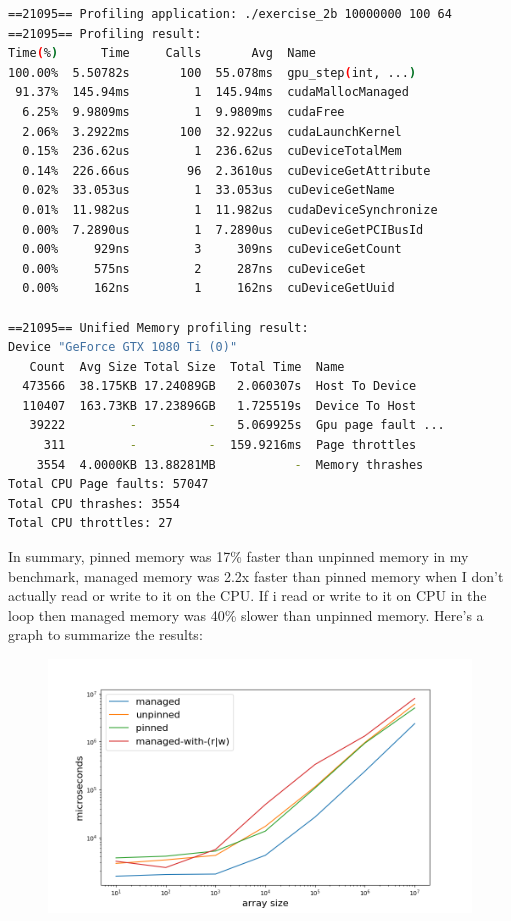 \documentclass{article}
\begin{document}
\begin{mdframed}[backgroundcolor=codeColor,leftmargin=0.0cm,hidealllines=true,%
  innerleftmargin=0.1cm,innerrightmargin=0.1cm,innertopmargin=0.5cm,innerbottommargin=0.10cm,
  roundcorner=15pt]
\begin{lstlisting}[language=bash]
==21095== Profiling application: ./exercise_2b 10000000 100 64
==21095== Profiling result:
Time(%)      Time     Calls       Avg  Name
100.00%  5.50782s       100  55.078ms  gpu_step(int, ...)
 91.37%  145.94ms         1  145.94ms  cudaMallocManaged
  6.25%  9.9809ms         1  9.9809ms  cudaFree
  2.06%  3.2922ms       100  32.922us  cudaLaunchKernel
  0.15%  236.62us         1  236.62us  cuDeviceTotalMem
  0.14%  226.66us        96  2.3610us  cuDeviceGetAttribute
  0.02%  33.053us         1  33.053us  cuDeviceGetName
  0.01%  11.982us         1  11.982us  cudaDeviceSynchronize
  0.00%  7.2890us         1  7.2890us  cuDeviceGetPCIBusId
  0.00%     929ns         3     309ns  cuDeviceGetCount
  0.00%     575ns         2     287ns  cuDeviceGet
  0.00%     162ns         1     162ns  cuDeviceGetUuid

==21095== Unified Memory profiling result:
Device "GeForce GTX 1080 Ti (0)"
   Count  Avg Size Total Size  Total Time  Name
  473566  38.175KB 17.24089GB   2.060307s  Host To Device
  110407  163.73KB 17.23896GB   1.725519s  Device To Host
   39222         -          -   5.069925s  Gpu page fault ...
     311         -          -  159.9216ms  Page throttles
    3554  4.0000KB 13.88281MB           -  Memory thrashes
Total CPU Page faults: 57047
Total CPU thrashes: 3554
Total CPU throttles: 27

\end{lstlisting}
\end{mdframed}

In summary, pinned memory was 17\% faster than unpinned memory in my benchmark, managed memory was 2.2x faster than pinned memory when I don't actually read or write to it on the CPU. If i read or write to it on CPU in the loop then managed
memory was 40\% slower than unpinned memory. Here's a graph to summarize the results:


\begin{figure}[H]
  \centering
  \includegraphics[width=0.98\linewidth]{ex_2/simulation-time.png}
  \label{fig:}
\end{figure}
\end{document}
